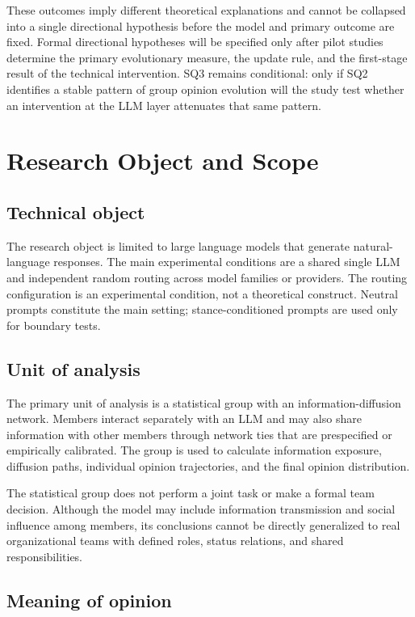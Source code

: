 \documentclass[11pt,a4paper]{article}
\begin{document}
These outcomes imply different theoretical explanations and cannot be collapsed into a single directional hypothesis before the model and primary outcome are fixed. Formal directional hypotheses will be specified only after pilot studies determine the primary evolutionary measure, the update rule, and the first-stage result of the technical intervention. SQ3 remains conditional: only if SQ2 identifies a stable pattern of group opinion evolution will the study test whether an intervention at the LLM layer attenuates that same pattern.

\section{Research Object and Scope}

\subsection{Technical object}

The research object is limited to large language models that generate natural-language responses. The main experimental conditions are a shared single LLM and independent random routing across model families or providers. The routing configuration is an experimental condition, not a theoretical construct. Neutral prompts constitute the main setting; stance-conditioned prompts are used only for boundary tests.

\subsection{Unit of analysis}

The primary unit of analysis is a statistical group with an information-diffusion network. Members interact separately with an LLM and may also share information with other members through network ties that are prespecified or empirically calibrated. The group is used to calculate information exposure, diffusion paths, individual opinion trajectories, and the final opinion distribution.

The statistical group does not perform a joint task or make a formal team decision. Although the model may include information transmission and social influence among members, its conclusions cannot be directly generalized to real organizational teams with defined roles, status relations, and shared responsibilities.

\subsection{Meaning of opinion}
\end{document}
